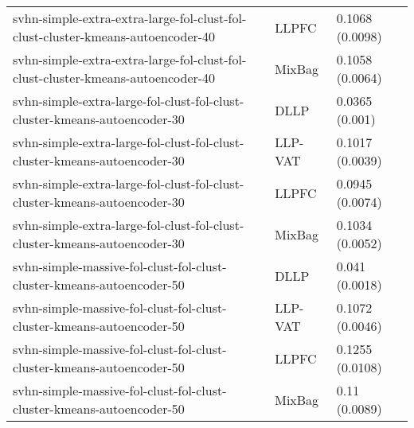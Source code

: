 \begin{longtable}{lll}
                              svhn-simple-extra-extra-large-fol-clust-fol-clust-cluster-kmeans-autoencoder-40 &     LLPFC &                           0.1068 (0.0098) \\
                              svhn-simple-extra-extra-large-fol-clust-fol-clust-cluster-kmeans-autoencoder-40 &    MixBag &                           0.1058 (0.0064) \\
                                    svhn-simple-extra-large-fol-clust-fol-clust-cluster-kmeans-autoencoder-30 &      DLLP &                            0.0365 (0.001) \\
                                    svhn-simple-extra-large-fol-clust-fol-clust-cluster-kmeans-autoencoder-30 &   LLP-VAT &                           0.1017 (0.0039) \\
                                    svhn-simple-extra-large-fol-clust-fol-clust-cluster-kmeans-autoencoder-30 &     LLPFC &                           0.0945 (0.0074) \\
                                    svhn-simple-extra-large-fol-clust-fol-clust-cluster-kmeans-autoencoder-30 &    MixBag &                           0.1034 (0.0052) \\
                                        svhn-simple-massive-fol-clust-fol-clust-cluster-kmeans-autoencoder-50 &      DLLP &                            0.041 (0.0018) \\
                                        svhn-simple-massive-fol-clust-fol-clust-cluster-kmeans-autoencoder-50 &   LLP-VAT &                           0.1072 (0.0046) \\
                                        svhn-simple-massive-fol-clust-fol-clust-cluster-kmeans-autoencoder-50 &     LLPFC &                           0.1255 (0.0108) \\
                                        svhn-simple-massive-fol-clust-fol-clust-cluster-kmeans-autoencoder-50 &    MixBag &                             0.11 (0.0089) \\
\end{longtable}
